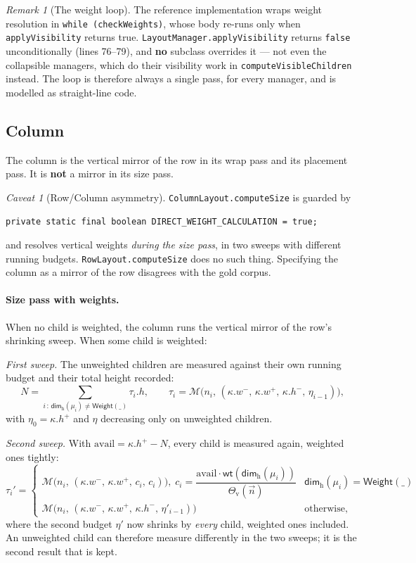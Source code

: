 \documentclass[11pt,a4paper]{article}
\newcommand{\Weight}{\mathsf{Weight}}
\newcommand{\Mm}{\mathcal{M}}          %
\newcommand{\Dimh}{\mathsf{dim}_{\mathrm{h}}}
\newcommand{\wt}{\mathsf{wt}}
\newcommand{\jv}[1]{\texttt{#1}}       %
\theoremstyle{definition}
\theoremstyle{plain}
\theoremstyle{remark}
\newtheorem*{remark}{Remark}
\newtheorem{warning}{Caveat}[section]
\begin{document}
\begin{remark}[The weight loop]
The reference implementation wraps weight resolution in
\jv{while (checkWeights)}, whose body re-runs only when \jv{applyVisibility}
returns true. \jv{LayoutManager.applyVisibility} returns \jv{false}
unconditionally (lines 76--79), and \textbf{no} subclass overrides it --- not
even the collapsible managers, which do their visibility work in
\jv{computeVisibleChildren} instead. The loop is therefore always a single pass,
for every manager, and is modelled as straight-line code.
\end{remark}

\subsection{Column}
\label{sec:column}

The column is the vertical mirror of the row in its wrap pass and its
placement pass. It is \textbf{not} a mirror in its size pass.

\begin{warning}[Row/Column asymmetry]
\label{sec:rowcolasym}
\jv{ColumnLayout.computeSize} is guarded by
\begin{center}
\jv{private static final boolean DIRECT\_WEIGHT\_CALCULATION = true;}
\end{center}
and resolves vertical weights \emph{during the size pass}, in two sweeps with
different running budgets. \jv{RowLayout.computeSize} does no such thing.
Specifying the column as a mirror of the row disagrees with the gold corpus.
\end{warning}

\paragraph{Size pass with weights.}
When no child is weighted, the column runs the vertical mirror of the row's
shrinking sweep. When some child is weighted:

\emph{First sweep.} The unweighted children are measured against their own
running budget and their total height recorded:
\[
  N = \!\!\sum_{i \,:\, \Dimh(\mu_i) \neq \Weight(\_)}\!\! \tau_i.h,
  \qquad
  \tau_i = \Mm\bigl(n_i,\, (\kappa.w^-,\, \kappa.w^+,\, \kappa.h^-,\, \eta_{i-1})\bigr),
\]
with $\eta_0 = \kappa.h^+$ and $\eta$ decreasing only on unweighted children.

\emph{Second sweep.} With $\mathrm{avail} = \kappa.h^+ - N$, every child is
measured again, weighted ones tightly:
\[
  \tau_i' = \begin{cases}
    \Mm\bigl(n_i,\, (\kappa.w^-,\, \kappa.w^+,\, c_i,\, c_i)\bigr),\;
      c_i = \dfrac{\mathrm{avail}\cdot\wt(\Dimh(\mu_i))}{\Theta_{\mathrm{v}}(\vec{n})}
      & \Dimh(\mu_i) = \Weight(\_) \\[10pt]
    \Mm\bigl(n_i,\, (\kappa.w^-,\, \kappa.w^+,\, \kappa.h^-,\, \eta'_{i-1})\bigr)
      & \text{otherwise,}
  \end{cases}
\]
where the second budget $\eta'$ now shrinks by \emph{every} child, weighted ones
included. An unweighted child can therefore measure differently in the two
sweeps; it is the second result that is kept.
\end{document}
